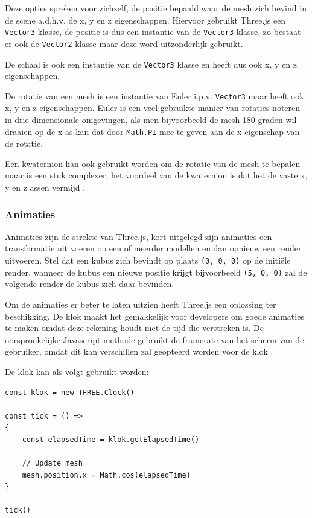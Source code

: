 Deze opties spreken voor zichzelf, de positie bepaald waar de mesh zich bevind in de scene a.d.h.v. de x, y en z eigenschappen. Hiervoor gebruikt Three.js een \texttt{Vector3} klasse, de positie is dus een instantie van de \texttt{Vector3} klasse, zo bestaat er ook de \texttt{Vector2} klasse maar deze word uitzonderlijk gebruikt.

De schaal is ook een instantie van de \texttt{Vector3} klasse en heeft dus ook x, y en z eigenschappen.

De rotatie van een mesh is een instantie van Euler i.p.v. \texttt{Vector3} maar heeft ook x, y en z eigenschappen. Euler is een veel gebruikte manier van rotaties noteren in drie-dimensionale omgevingen, als men bijvoorbeeld de mesh 180 graden wil draaien op de x-as kan dat door \texttt{Math.PI} mee te geven aan de x-eigenschap van de rotatie.

Een kwaternion kan ook gebruikt worden om de rotatie van de mesh te bepalen maar is een stuk complexer, het voordeel van de kwaternion is dat het de vaste x, y en z assen vermijd \autocite{Simon2023}.

\subsubsection{Animaties}

Animaties zijn de strekte van Three.js, kort uitgelegd zijn animaties een transformatie uit voeren op een of meerder modellen en dan opnieuw een render uitvoeren. Stel dat een kubus zich bevindt op plaats \texttt{(0, 0, 0)} op de initiële render, wanneer de kubus een nieuwe positie krijgt bijvoorbeeld \texttt{(5, 0, 0)} zal de volgende render de kubus zich daar bevinden. 

Om de animaties er beter te laten uitzien heeft Three.js een oplossing ter beschikking. De klok maakt het gemakkelijk voor developers om goede animaties te maken omdat deze rekening houdt met de tijd die verstreken is. De oorspronkelijke Javascript methode gebruikt de framerate van het scherm van de gebruiker, omdat dit kan verschillen zal geopteerd worden voor de klok \autocite{Simon2023}.

De klok kan als volgt gebruikt worden:

\begin{lstlisting}
const klok = new THREE.Clock()

const tick = () =>
{
	const elapsedTime = klok.getElapsedTime()
	
	// Update mesh
	mesh.position.x = Math.cos(elapsedTime)
}

tick()
\end{lstlisting}

